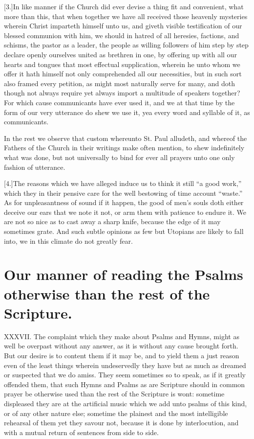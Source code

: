 [3.]In like manner if the Church did ever devise a thing fit and convenient, what more than this, that when together we have all received those heavenly mysteries wherein Christ imparteth himself unto us, and giveth visible testification of our blessed communion with him, we should in hatred of all heresies, factions, and schisms, the pastor as a leader, the people as willing followers of him step by step declare openly ourselves united as brethren in one, by offering up with all our hearts and tongues that most effectual supplication, wherein he unto whom we offer it hath himself not only comprehended all our necessities, but in such sort also framed every petition, as might most naturally serve for many, and doth though not always require yet always import a multitude of speakers together? For which cause communicants have ever used it, and we at that time by the form of our very utterance do shew we use it, yea every word and syllable of it, as communicants.

In the rest we observe that custom whereunto St. Paul alludeth, and whereof the Fathers of the Church in their writings make often mention, to shew indefinitely what was  done, but not universally to bind for ever all prayers unto one only fashion of utterance.

[4.]The reasons which we have alleged induce us to think it still “a good work,” which they in their pensive care for the well bestowing of time account “waste.” As for unpleasantness of sound if it happen, the good of men’s souls doth either deceive our ears that we note it not, or arm them with patience to endure it. We are not so nice as to cast away a sharp knife, because the edge of it may sometimes grate. And such subtle opinions as few but Utopians are likely to fall into, we in this climate do not greatly fear.


\section*{Our manner of reading the Psalms otherwise than the rest of the Scripture.}
XXXVII. The complaint which they make about Psalms and Hymns, might as well be overpast without any answer, as it is without any cause brought forth. But our desire is to content them if it may be, and to yield them a just reason even of the least things wherein undeservedly they have but as much as dreamed or suspected that we do amiss. They seem sometimes so to speak, as if it greatly offended them, that such Hymns and Psalms as are Scripture should in common prayer be otherwise used than the rest of the Scripture is wont: sometime displeased they are at the artificial music which we add unto psalms of this kind, or of any other nature else; sometime the plainest and the most intelligible rehearsal of them yet they savour not, because it is done by interlocution, and with a mutual return of sentences from side to side.

